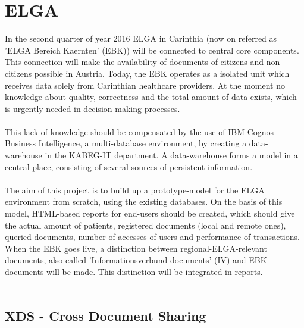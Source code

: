 \documentclass[a4paper]{article}
\begin{document}
	\section{ELGA }
	In the second quarter of year 2016 ELGA in Carinthia (now on referred as 'ELGA Bereich
	Kaernten' (EBK)) will be connected to central core components. This connection
	will make the availability of documents of citizens and 
	non-citizens possible in Austria. Today, the EBK operates
	as a isolated unit which receives data solely from Carinthian healthcare
	providers.
	At the moment no knowledge about quality, correctness and the total amount of
	data exists, which is urgently needed in decision-making processes.\\
	\\
 	This lack of knowledge should be compensated by the use of IBM Cognos Business 
 	Intelligence, a multi-database environment, by creating a data-warehouse in the KABEG-IT
 	department. A data-warehouse forms a model in a central place, consisting of
 	several sources of persistent information.\\
 	\\
	The aim of this project is to build up a prototype-model for the ELGA environment from 
	scratch, using the existing databases. On the basis of this model, HTML-based reports 
	for end-users should be created, which should give the actual amount of patients,
	registered documents (local and remote ones), queried documents, number 
	of accesses of users and performance of transactions. When the EBK goes live, a distinction
	between regional-ELGA-relevant documents, also called 'Informationsverbund-documents' (IV)
	and EBK-documents will be made. This distinction will be integrated in reports.\\
	\\
	
	\subsection{XDS - Cross Document Sharing}
	
\end{document}
